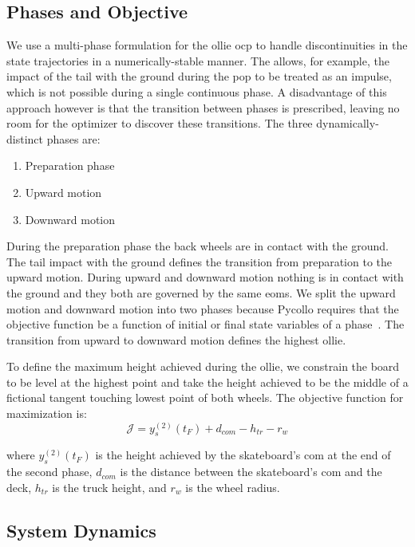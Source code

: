 \documentclass[default,iicol]{sn-jnl}
\begin{document}
\subsection{Phases and Objective} \label{s_phases}

We use a multi-phase formulation for the ollie \gls{ocp} to handle discontinuities in the state trajectories in a numerically-stable manner. The allows, for example, the impact of the tail with the ground during the pop to be treated as an impulse, which is not possible during a single continuous phase. A disadvantage of this approach however is that the transition between phases is prescribed, leaving no room for the optimizer to discover these transitions. The three dynamically-distinct phases are:
\begin{enumerate} \label{n_phases}
  \item Preparation phase
  \item Upward motion
  \item Downward motion
\end{enumerate}

During the preparation phase the back wheels are in contact with the ground. The tail impact with the ground defines the transition from preparation to the upward motion. During upward and downward motion nothing is in contact with the ground and they both are governed by the same \glspl{eom}. We split the upward motion and downward motion into two phases because Pycollo requires that the objective function be a function of initial or final state variables of a phase~\cite{brockie_2021_predictive}. The transition from upward to downward motion defines the highest ollie.

To  define the maximum height achieved during the ollie, we constrain the board to be level at the highest point and
take the height achieved to be the middle of a fictional tangent touching lowest point of both wheels. The objective function for maximization is:
%
\begin{equation}
  \mathcal{J} = y_s^{(2)}(t_F) + d_{com} - h_{tr} - r_w
\end{equation}

\noindent where $y_s^{(2)}(t_F)$ is the height achieved by the skateboard's \gls{com} at the end of the second phase, $d_{com}$ is the distance between the skateboard's \gls{com} and the deck, $h_{tr}$ is the truck height, and $r_w$ is the wheel radius.

\subsection{System Dynamics}\label{s_systemdynamics}
\end{document}
